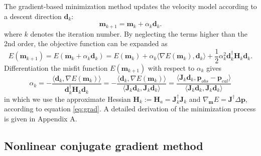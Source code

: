 The gradient-based minimization method updates the velocity model according to a descent direction $\textbf{d}_k$:
\begin{equation}\label{eq:cg}
\textbf{m}_{k+1}=\textbf{m}_k+\alpha_k \textbf{d}_k.
\end{equation}
where $k$ denotes the iteration number. By neglecting the terms higher than the 2nd order, the objective function can be expanded as
\begin{equation}
E(\textbf{m}_{k+1})=E(\textbf{m}_k+\alpha_k \textbf{d}_{k})=E(\textbf{m}_k)+\alpha_k \langle\nabla E(\textbf{m}_k),\textbf{d}_k\rangle+\frac{1}{2}\alpha_k^2\textbf{d}_k^{\dagger}\textbf{H}_k\textbf{d}_k.
\end{equation}
Differentiation the misfit function $E(\textbf{m}_{k+1})$ with respect to $\alpha_k$ gives
\begin{equation}\label{eq:alpha1}
\alpha_k=-\frac{\langle\textbf{d}_k,\nabla E(\textbf{m}_k)\rangle}{\textbf{d}_k^{\dagger}\textbf{H}_k\textbf{d}_k}
=-\frac{\langle\textbf{d}_k,\nabla E(\textbf{m}_k)\rangle}{\langle\textbf{J}_k\textbf{d}_k,\textbf{J}_k\textbf{d}_k\rangle}
=\frac{\langle\textbf{J}_k\textbf{d}_k,\textbf{p}_{obs}-\textbf{p}_{cal}\rangle}{\langle\textbf{J}_k\textbf{d}_k,\textbf{J}_k\textbf{d}_k\rangle}
\end{equation}
in which we use the approximate Hessian $\textbf{H}_k:=\textbf{H}_a=\textbf{J}_k^{\dagger}\textbf{J}_k$ and $\nabla_{\textbf{m}}E=\textbf{J}^{\dagger}\Delta \textbf{p}$, according to equation \eqref{eq:grad}. A detailed derivation of the minimization process is given in Appendix A.


\subsection{Nonlinear conjugate gradient method}

